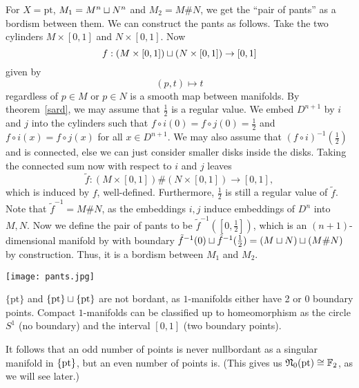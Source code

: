\documentclass[a4paper,12pt]{article}
\begin{document}
\begin{example}\label{pants}
    For \(X=\mathrm{pt}\), \(M_1=M^n\sqcup N^n\) and \(M_2=M\# N\), we get the \enquote{pair of pants} as a bordism between them. We can construct the pants as follows. Take the two cylinders \(M\times [0,1]\) and \(N\times[0,1]\). Now \[f:(M\times[0,1])\sqcup(N\times[0,1])\to [0,1]\]
    given by
    \[(p,t)\mapsto t\] regardless of \(p\in M\) or \(p\in N\) is a smooth map between manifolds. By theorem\ \ref{sard}, we may assume that \(\frac12\) is a regular value. We embed \(D^{n+1}\) by \(i\) and \(j\) into the cylinders such that \(f\circ i(0)=f\circ j(0)=\frac12\) and \(f\circ i(x)=f\circ j(x)\) for all \(x\in D^{n+1}\). 
    We may also assume that \({(f\circ i)}^{-1}(\frac{1}{2})\) and is connected, else we can just consider smaller disks inside the disks. 
    Taking the connected sum now with respect to \(i\) and \(j\) leaves 
    \[\tilde f:(M\times[0,1])\#(N\times[0,1])\to[0,1],\]
    which is induced  by \(f\), well-defined. Furthermore, \(\frac12\) is still a regular value of \(\tilde f\). 
    Note that \(\tilde{f}^{-1}=M\#N\), as the embeddings \(i,j\) induce embeddings of \(D^n\) into \(M,N\). 
    Now we define the pair of pants to be \(\tilde{f}^{-1}([0,\frac12])\), which is an \((n+1)\)-dimensional manifold by with boundary \(\tilde f^{-1}(0)\sqcup\tilde f^{-1}(\frac12)=(M\sqcup N)\sqcup(M\#N)\) by construction. Thus, it is a bordism between \(M_1\) and \(M_2\).
    \begin{center}
        \texttt{[image: pants.jpg]}
    \end{center}
\end{example}

\begin{example}\label{points}
    \(\{\mathrm{pt}\}\) and \(\{\mathrm{pt}\}\sqcup\{\mathrm{pt}\}\) are not bordant, as \(1\)-manifolds either have 2 or 0 boundary points. Compact \(1\)-manifolds can be classified up to homeomorphism as the circle \(S^1\) (no boundary) and the interval \([0,1]\) (two boundary points). %
\end{example}

\begin{remark}
     It follows that an odd number of points is never nullbordant as a singular manifold in \(\{\mathrm{pt}\}\), but an even number of points is. (This gives us \(\mathfrak{N}_0(\mathrm{pt})\cong\mathbb{F}_2\), as we will see later.)
\end{remark}
\end{document}
